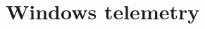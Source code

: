 \documentclass{report}
\begin{document}
\section{Windows telemetry}
\label{sec:windows-telemetry}

\end{document}
